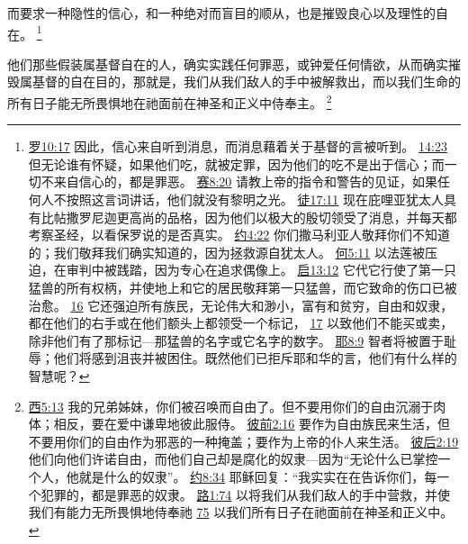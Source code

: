 \documentclass[12pt, a4paper, oneside]{ctexart}
\newcounter{parnum}[section]
\newcommand{\N}{%
   \noindent\refstepcounter{parnum}%
    \makebox[\parindent][l]{\textbf{\arabic{parnum}.}}}
\begin{document}
	而要求一种隐性的信心，和一种绝对而盲目的顺从，也是摧毁良心以及理性的自在。
	\footnote {
		\href{https://biblehub.com/romans/10-17.htm}{罗10:17} 因此，信心来自听到消息，而消息藉着关于基督的言被听到。
		\href{https://biblehub.com/romans/14-23.htm}{14:23} 但无论谁有怀疑，如果他们吃，就被定罪，因为他们的吃不是出于信心；而一切不来自信心的，都是罪恶。
		\href{https://biblehub.com/isaiah/8-20.htm}{赛8:20} 请教上帝的指令和警告的见证，如果任何人不按照这言词讲话，他们就没有黎明之光。
		\href{https://biblehub.com/acts/17-11.htm}{徒17:11} 现在庇哩亚犹太人具有比帖撒罗尼迦更高尚的品格，因为他们以极大的殷切领受了消息，并每天都考察圣经，以看保罗说的是否真实。
		\href{https://biblehub.com/john/4-22.htm}{约4:22} 你们撒马利亚人敬拜你们不知道的；我们敬拜我们确实知道的，因为拯救源自犹太人。
		\href{https://biblehub.com/hosea/5-11.htm}{何5:11} 以法莲被压迫，在审判中被践踏，因为专心在追求偶像上。
		\href{https://biblehub.com/revelation/13-12.htm}{启13:12} 它代它行使了第一只猛兽的所有权柄，并使地上和它的居民敬拜第一只猛兽，而它致命的伤口已被治愈。
		\href{https://biblehub.com/revelation/13-16.htm}{16} 它还强迫所有族民，无论伟大和渺小，富有和贫穷，自由和奴隶，都在他们的右手或在他们额头上都领受一个标记，
		\href{https://biblehub.com/revelation/13-17.htm}{17} 以致他们不能买或卖，除非他们有了那标记---那猛兽的名字或它名字的数字。
		\href{https://biblehub.com/jeremiah/8-9.htm}{耶8:9} 智者将被置于耻辱；他们将感到沮丧并被困住。既然他们已拒斥耶和华的言，他们有什么样的智慧呢？
	}

\N 他们那些假装属基督自在的人，确实实践任何罪恶，或钟爱任何情欲，从而确实摧毁属基督的自在目的，那就是，我们从我们敌人的手中被解救出，而以我们生命的所有日子能无所畏惧地在祂面前在神圣和正义中侍奉主。
	\footnote {
		\href{https://biblehub.com/galatians/5-13.htm}{西5:13} 我的兄弟姊妹，你们被召唤而自由了。但不要用你们的自由沉溺于肉体；相反，要在爱中谦卑地彼此服侍。
		\href{https://biblehub.com/1_peter/2-16.htm}{彼前2:16} 要作为自由族民来生活，但不要用你们的自由作为邪恶的一种掩盖；要作为上帝的仆人来生活。
		\href{https://biblehub.com/2_peter/2-19.htm}{彼后2:19} 他们向他们许诺自由，而他们自己却是腐化的奴隶---因为“无论什么已掌控一个人，他就是什么的奴隶”。
		\href{https://biblehub.com/john/8-34.htm}{约8:34} 耶稣回复：“我实实在在告诉你们，每一个犯罪的，都是罪恶的奴隶。
		\href{https://biblehub.com/luke/1-74.htm}{路1:74} 以将我们从我们敌人的手中营救，并使我们有能力无所畏惧地侍奉祂
		\href{https://biblehub.com/luke/1-75.htm}{75} 以我们所有日子在祂面前在神圣和正义中。
	}
\end{document}

